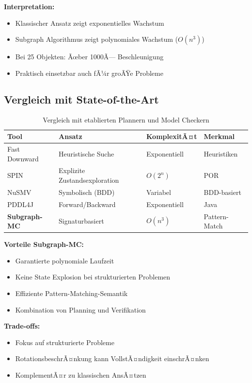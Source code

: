 ﻿\documentclass[a4paper,12pt]{article}
\theoremstyle{definition}
\begin{document}
\textbf{Interpretation:}
\begin{itemize}
	\item[-] Klassischer Ansatz zeigt exponentielles Wachstum
	\item[-] Subgraph Algorithmus zeigt polynomiales Wachstum ($O(n^3)$)
	\item[-] Bei 25 Objekten: Ãœber 1000Ã— Beschleunigung
	\item[-] Praktisch einsetzbar auch fÃ¼r groÃŸe Probleme
\end{itemize}

\subsection{Vergleich mit State-of-the-Art}

\begin{table}[h]
	\centering
	\caption{Vergleich mit etablierten Plannern und Model Checkern}
	\label{tab:sota_comparison}
	\begin{tabular}{lp{3.5cm}ll}
		\toprule
		Tool & Ansatz & Komplexi\-tÃ¤t & Merkmal \\
		\midrule
		Fast Downward & Heuristische Suche & Exponentiell & Heuristiken \\
		SPIN & Explizite Zustands\-exploration & $O(2^n)$ & POR \\
		NuSMV & Symbolisch (BDD) & Variabel & BDD-basiert \\
		PDDL4J & Forward/Backward & Exponentiell & Java \\
		\textbf{Subgraph-MC} & Signaturbasiert & \textbf{$O(n^3)$} & Pattern-Match \\
		\bottomrule
	\end{tabular}
\end{table}

\textbf{Vorteile Subgraph-MC:}
\begin{itemize}
	\item[-] Garantierte polynomiale Laufzeit
	\item[-] Keine State Explosion bei strukturierten Problemen
	\item[-] Effiziente Pattern-Matching-Semantik
	\item[-] Kombination von Planning und Verifikation
\end{itemize}

\textbf{Trade-offs:}
\begin{itemize}
	\item[-] Fokus auf strukturierte Probleme
	\item[-] RotationsbeschrÃ¤nkung kann VollstÃ¤ndigkeit einschrÃ¤nken
	\item[-] KomplementÃ¤r zu klassischen AnsÃ¤tzen
\end{itemize}
\end{document}
